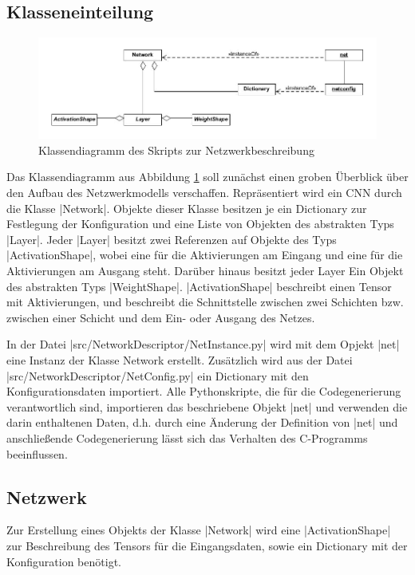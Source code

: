 \documentclass[../main.tex]{subfiles}
\begin{document}
\subsection{Klasseneinteilung}
\begin{figure}
	\centering 
	\includegraphics[width=\textwidth]{../images/Schmidt/cd_netdesc.jpg} 
	\caption {Klassendiagramm des Skripts zur Netzwerkbeschreibung}
	\label{pic:cd_Netdesc} 
\end{figure} 
Das Klassendiagramm aus Abbildung \ref{pic:cd_Netdesc} soll zunächst einen groben Überblick  über den Aufbau des Netzwerkmodells verschaffen. Repräsentiert wird ein CNN durch die Klasse |Network|. Objekte dieser Klasse besitzen je ein Dictionary zur Festlegung der Konfiguration und eine Liste von Objekten des abstrakten Typs |Layer|. Jeder |Layer| besitzt zwei Referenzen auf Objekte des Typs |ActivationShape|, wobei eine für die Aktivierungen am Eingang und eine für die Aktivierungen am Ausgang steht. Darüber hinaus besitzt jeder Layer Ein Objekt des abstrakten Typs |WeightShape|. |ActivationShape| beschreibt einen Tensor mit Aktivierungen, und beschreibt die Schnittstelle zwischen zwei Schichten bzw. zwischen einer Schicht und dem Ein- oder Ausgang des Netzes. 

In der Datei |src/NetworkDescriptor/NetInstance.py| wird mit dem Opjekt |net| eine Instanz der Klasse Network erstellt. Zusätzlich wird aus der Datei |src/NetworkDescriptor/NetConfig.py| ein Dictionary mit den Konfigurationsdaten importiert. Alle Pythonskripte, die für die Codegenerierung verantwortlich sind, importieren das beschriebene Objekt |net| und verwenden die darin enthaltenen Daten, d.h. durch eine Änderung der Definition von |net| und anschließende Codegenerierung lässt sich das Verhalten des C-Programms beeinflussen. 

\subsection{Netzwerk}
Zur Erstellung eines Objekts der Klasse |Network| wird eine |ActivationShape| zur Beschreibung des Tensors für die Eingangsdaten, sowie ein Dictionary mit der Konfiguration benötigt. 
\end{document}
